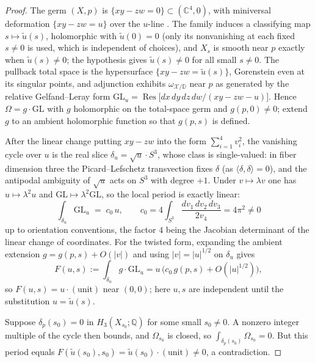 \documentclass[11pt]{amsart}
\theoremstyle{definition}
\theoremstyle{remark}
\theoremstyle{plain}
\newcommand{\QQ}{\mathbb{Q}}
\newcommand{\CC}{\mathbb{C}}
\newcommand{\cX}{\mathcal{X}}
\newcommand{\GL}{\mathrm{GL}}
\newcommand{\Disk}{\mathbb{D}}
\begin{document}
\begin{proof}
The germ $(X,p)$ is $\{xy-zw=0\}\subset(\CC^4,0)$, with miniversal
deformation $\{xy-zw=u\}$ over the $u$-line
\cite{KasSchlessinger72}.  The family induces a classifying map
$s\mapsto\tilde u(s)$, holomorphic with $\tilde u(0)=0$ (only its
nonvanishing at each fixed $s\neq0$ is used, which is independent of
choices), and $X_s$
is smooth near $p$ exactly when $\tilde u(s)\neq0$; the hypothesis
gives $\tilde u(s)\neq0$ for all small $s\neq0$.  The pullback total
space is the hypersurface $\{xy-zw=\tilde u(s)\}$, Gorenstein even at
its singular points, and adjunction exhibits $\omega_{\cX/\Disk}$
near $p$ as generated by the relative Gelfand--Leray form
$\GL_u=\operatorname{Res}\bigl[dx\,dy\,dz\,dw/(xy-zw-u)\bigr]$.
Hence $\Omega=g\cdot\GL$ with $g$ holomorphic on the total-space germ
and $g(p,0)\neq0$; extend $g$ to an ambient holomorphic function so
that $g(p,s)$ is defined.

After the linear change putting $xy-zw$ into the form
$\sum_{i=1}^4v_i^2$, the vanishing cycle over $u$ is the real slice
$\delta_u=\sqrt u\cdot S^3$, whose class is single-valued: in fiber
dimension three the Picard--Lefschetz transvection fixes $\delta$
(as $\langle\delta,\delta\rangle=0$), and the antipodal ambiguity of
$\sqrt u$ acts on $S^3$ with degree $+1$.  Under
$v\mapsto\lambda v$ one has $u\mapsto\lambda^2u$ and
$\GL\mapsto\lambda^2\GL$, so the local period is exactly linear:
\[
\int_{\delta_u}\GL_u\;=\;c_0\,u,
\qquad
c_0=4\int_{S^3}\frac{dv_1\,dv_2\,dv_3}{2v_4}=4\pi^2\neq0
\]
up to orientation conventions, the factor $4$ being the Jacobian
determinant of the linear change of coordinates.  For the twisted form, expanding the
ambient extension $g=g(p,s)+O(|v|)$ and using $|v|=|u|^{1/2}$ on
$\delta_u$ gives
\[
F(u,s):=\int_{\delta_u}g\cdot\GL_u
= u\,\bigl(c_0\,g(p,s)+O(|u|^{1/2})\bigr),
\]
so $F(u,s)=u\cdot(\text{unit})$ near $(0,0)$; here $u,s$ are
independent until the substitution $u=\tilde u(s)$.

Suppose $\delta_p(s_0)=0$ in $H_3(X_{s_0};\QQ)$ for some small
$s_0\neq0$.  A nonzero integer multiple of the cycle then bounds, and
$\Omega_{s_0}$ is closed, so
$\int_{\delta_p(s_0)}\Omega_{s_0}=0$.  But this period equals
$F(\tilde u(s_0),s_0)=\tilde u(s_0)\cdot(\text{unit})\neq0$, a
contradiction.
\end{proof}
\end{document}
